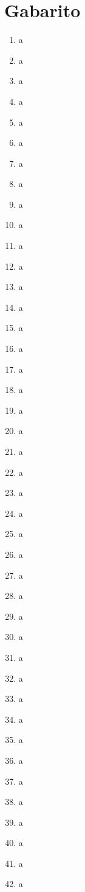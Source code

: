 \documentclass[12pt,a4paper]{article}
\begin{document}
\newpage

\section*{Gabarito}

\begin{multicols}{2}
\begin{enumerate}[label=\textbf{Q\arabic*.}]
    \item a
    \item a
    \item a
    \item a
    \item a
    \item a
    \item a
    \item a
    \item a
    \item a
    \item a
    \item a
    \item a
    \item a
    \item a
    \item a
    \item a
    \item a
    \item a
    \item a
    \item a
    \item a
    \item a
    \item a
    \item a
    \item a
    \item a
    \item a
    \item a
    \item a
    \item a
    \item a
    \item a
    \item a
    \item a
    \item a
    \item a
    \item a
    \item a
    \item a
    \item a
    \item a

\end{enumerate}
\end{multicols}
\end{document}
